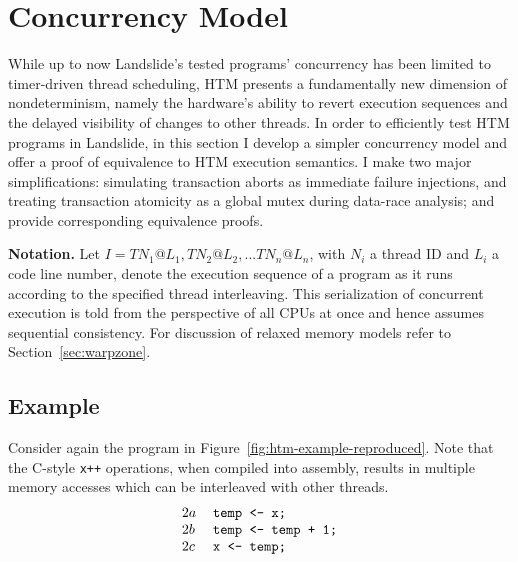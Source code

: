 
\section{Concurrency Model}
\label{sec:tm-design}

While up to now Landslide's tested programs' concurrency has been limited to timer-driven thread scheduling,
HTM presents a fundamentally new dimension of nondeterminism,
namely the hardware's ability to revert execution sequences
and the delayed visibility of changes to other threads.
In order to efficiently test HTM programs in Landslide,
in this section
I develop a simpler concurrency model and offer a proof of equivalence to HTM execution semantics.
I make two major simplifications:
simulating transaction aborts as immediate failure injections,
and treating transaction atomicity as a global mutex during data-race analysis;
and provide corresponding equivalence proofs.

{\bf Notation.} Let $I = TN_1@L_1, TN_2@L_2, ... TN_n@L_n$,
with $N_i$ a thread ID and $L_i$ a code line number,
denote the execution sequence of a program as it runs according to the specified thread interleaving.
This serialization of concurrent execution is told from the perspective of all CPUs at once
and hence assumes sequential consistency.
For discussion of relaxed memory models refer to Section~\ref{sec:warpzone}.

\subsection{Example}

Consider again the program in Figure~\ref{fig:htm-example-reproduced}.
Note that the C-style {\tt x++} operations, when compiled into assembly, %
results in multiple memory accesses which can be interleaved with other threads.
\[
\begin{tabular}{ll}
	$2a$ & \texttt{temp <- x;} \\
	$2b$ & \texttt{temp <- temp + 1;} \\
	$2c$ & \texttt{x <- temp;} \\
\end{tabular}
\]

\newcommand\ti{\ensuremath{\hilight{lavender}{\mathbf{T1}}}\xspace}
\newcommand\tj{\ensuremath{\hilight{seafoam}{\mathbf{T2}}}\xspace}
\newcommand\tk{\ensuremath{\hilight{salmon}{\mathbf{T3}}}\xspace}

